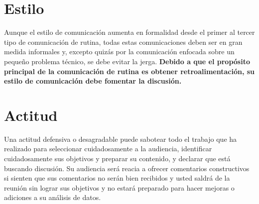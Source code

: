 \documentclass[10pt]{book}
\begin{document}
    \section{Estilo}
    Aunque el estilo de comunicación aumenta en formalidad desde el primer al tercer tipo de comunicación de rutina, todas estas comunicaciones deben ser en gran medida informales y, excepto quizás por la comunicación enfocada sobre un pequeño problema técnico, se debe evitar la jerga. \textbf{Debido a que el propósito principal de la comunicación de rutina es obtener retroalimentación, su estilo de comunicación debe fomentar la discusión.} 
    \section{Actitud}
    Una actitud defensiva o desagradable puede sabotear todo el trabajo que ha realizado para seleccionar cuidadosamente a la audiencia, identificar cuidadosamente sus objetivos y preparar su contenido, y declarar que está buscando discusión. Su audiencia será reacia a ofrecer comentarios constructivos si sienten que sus comentarios no serán bien recibidos y usted saldrá de la reunión sin lograr sus objetivos y no estará preparado para hacer mejoras o adiciones a su análisis de datos.
\end{document}
